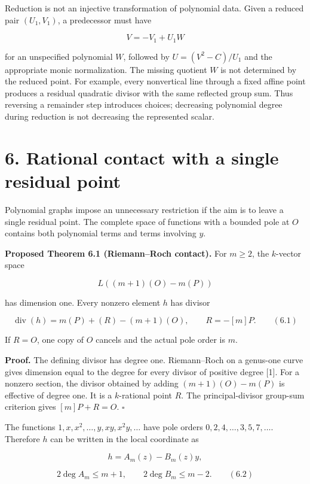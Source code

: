 \documentclass[
  11pt,
  a4paper,
]{article}
\begin{document}
Reduction is not an injective transformation of polynomial data. Given a
reduced pair \((U_1,V_1)\), a predecessor must have

\[
V=-V_1+U_1W
\]

for an unspecified polynomial \(W\), followed by \(U=(V^2-C)/U_1\) and
the appropriate monic normalization. The missing quotient \(W\) is not
determined by the reduced point. For example, every nonvertical line
through a fixed affine point produces a residual quadratic divisor with
the same reflected group sum. Thus reversing a remainder step introduces
choices; decreasing polynomial degree during reduction is not decreasing
the represented scalar.

\section{6. Rational contact with a single residual
point}\label{rational-contact-with-a-single-residual-point}

Polynomial graphs impose an unnecessary restriction if the aim is to
leave a single residual point. The complete space of functions with a
bounded pole at \(O\) contains both polynomial terms and terms involving
\(y\).

\textbf{Proposed Theorem 6.1 (Riemann--Roch contact).} For \(m\geq2\),
the \(k\)-vector space

\[
L((m+1)(O)-m(P))
\]

has dimension one. Every nonzero element \(h\) has divisor

\[
\operatorname{div}(h)=m(P)+(R)-(m+1)(O),\qquad R=-[m]P. \qquad (6.1)
\]

If \(R=O\), one copy of \(O\) cancels and the actual pole order is
\(m\).

\textbf{Proof.} The defining divisor has degree one. Riemann--Roch on a
genus-one curve gives dimension equal to the degree for every divisor of
positive degree {[}1{]}. For a nonzero section, the divisor obtained by
adding \((m+1)(O)-m(P)\) is effective of degree one. It is a
\(k\)-rational point \(R\). The principal-divisor group-sum criterion
gives \([m]P+R=O\). \(\square\)

The functions \(1,x,x^2,\ldots,y,xy,x^2y,\ldots\) have pole orders
\(0,2,4,\ldots,3,5,7,\ldots\). Therefore \(h\) can be written in the
local coordinate as

\[
h=A_m(z)-B_m(z)y,
\]

\[
2\deg A_m\leq m+1,\qquad 2\deg B_m\leq m-2. \qquad (6.2)
\]
\end{document}
